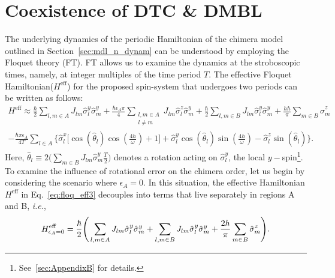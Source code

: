 \documentclass[12pt]{iopart}
\begin{document}
\section{\label{sec:level3}Coexistence of DTC \& DMBL}	
The underlying dynamics of the periodic Hamiltonian of the chimera model outlined in Section~\ref{sec:mdl_n_dynam} can be understood by employing the Floquet theory (FT). FT allows us to examine the dynamics at the stroboscopic times, namely, at integer multiples of the time period $T$. The effective Floquet Hamiltonian($H^{\mathrm{eff}}$) for the proposed spin-system that undergoes two periods can be written as follows:
\begin{multline}
    H^{\mathrm{eff}} \approx\frac{\hbar}{2} \sum_{l,m\in A}J_{lm}\hat{\sigma}_l^y\hat{\sigma}_m^y +\frac{\hbar \epsilon_A \pi}{4} \sum_{\substack{l,m\in A\\l\neq m}} J_{lm}\hat{\sigma}^z_l\hat{\sigma}^y_m + \frac{\hbar}{2}\sum_{l,m\in B}J_{lm}\hat{\sigma}_l^y \hat{\sigma}_m^y + \frac{h\hbar}{\pi}\sum_{m \in B}\hat{\sigma}^z_m \\ -\frac{\hbar \pi \epsilon_A}{4T}\sum_{l\in A}\Bigg\{\hat{\sigma}^x_l \bigg[\cos(\hat{\theta}_l)\cos(\frac{4h}{\omega})+1 \bigg] + \hat{\sigma}^y_l \cos(\hat{\theta}_l)\sin(\frac{4h}{\omega})-\hat{\sigma}^z_l \sin(\hat{\theta}_l)\Bigg\}.
    \label{eq:floq_eff3}
\end{multline}
Here, $\displaystyle \hat{\theta}_l \equiv 2 \Big(\sum_{m \in B}J_{lm}\hat{\sigma}^y_m \frac{T}{2} \Big)$ denotes a rotation acting on $\hat{\sigma}^y_l$, the local $y-$spin\footnote{See~\ref{sec:AppendixB} for details.}. 
To examine the influence of rotational error on the chimera order, let us begin by considering the scenario where $\epsilon_A=0$. In this situation, the effective Hamiltonian $H^\mathrm{eff}$ in Eq.~\eqref{eq:floq_eff3}  decouples into terms that live separately in regions A and B, \textit{i.e.},
\begin{equation}
    H^{\mathrm{eff}}_{\epsilon_A=0} =  \frac{\hbar}{2}\Bigg( \sum_{l,m\in A} J_{lm} \hat{\sigma}^y_l\hat{\sigma}^y_m +\sum_{l,m\in B} J_{lm} \hat{\sigma}^y_l\hat{\sigma}^y_m\\+\frac{2h }{\pi}\sum_{m \in B}\hat{\sigma}^z_m\Bigg).
\end{equation}
	
\end{document}
